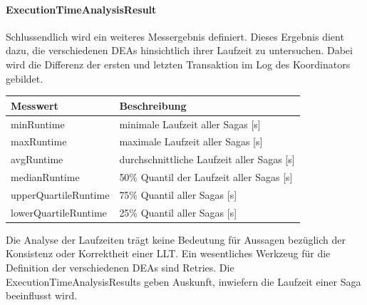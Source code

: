 \paragraph*{ExecutionTimeAnalysisResult}
Schlussendlich wird ein weiteres Messergebnis definiert. Dieses Ergebnis dient dazu, die verschiedenen DEAs hinsichtlich ihrer Laufzeit zu untersuchen. Dabei wird die Differenz der ersten und letzten Transaktion im Log des Koordinators gebildet. 

\begin{center}
	\begin{longtable}[h]{|p{5cm}|p{12cm}|}
		\hline
		Messwert & Beschreibung \\ \hline
		minRuntime & minimale Laufzeit aller Sagas [s]\\ \hline
		maxRuntime & maximale Laufzeit aller Sagas [s]\\ \hline
		avgRuntime & durchschnittliche Laufzeit aller Sagas [s]\\ \hline
		medianRuntime & 50\% Quantil der Laufzeit aller Sagas [s]\\ \hline
		upperQuartileRuntime & 75\% Quantil aller Sagas [s]\\ \hline
		lowerQuartileRuntime & 25\% Quantil aller Sagas [s]\\ \hline
\end{longtable}
\end{center}
\FloatBarrier

Die Analyse der Laufzeiten trägt keine Bedeutung für Aussagen bezüglich der Konsistenz oder Korrektheit einer LLT. Ein wesentliches Werkzeug für die Definition der verschiedenen DEAs sind Retries. Die ExecutionTimeAnalysisResults geben Auskunft, inwiefern die Laufzeit einer Saga beeinflusst wird.